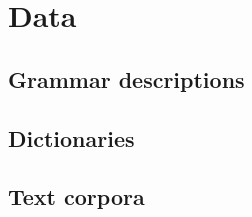 \section{Data}

\subsection{Grammar descriptions}
\subsection{Dictionaries}
\subsection{Text corpora}
